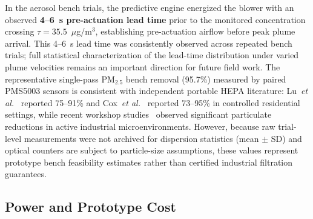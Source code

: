 \documentclass[12pt,a4paper]{article}
\newcommand{\etal}{\textit{et al.}}
\newcommand{\ugsm}{$\mu$g/m$^3$}
\begin{document}
In the aerosol bench trials, the predictive engine energized the blower with an observed
\textbf{4--6~s pre-actuation lead time} prior to the monitored concentration crossing
$\tau=35.5$~\ugsm, establishing pre-actuation airflow before peak plume arrival. This
4--6~s lead time was consistently observed across repeated bench trials; full statistical characterization
of the lead-time distribution under varied plume velocities remains an important direction for future field work.
The representative single-pass PM$_{2.5}$ bench removal (95.7\%) measured by paired PMS5003 sensors is consistent
with independent portable HEPA literature: Lu~\etal{}~\citep{lu2023realworld} reported 75--91\% and
Cox~\etal{}~\citep{cox2018effectiveness} reported 73--95\% in controlled residential settings, while recent
workshop studies~\citep{workshopcleaner2025} observed significant particulate reductions in active industrial microenvironments.
However, because raw trial-level measurements were not archived for dispersion statistics (mean $\pm$ SD) and optical
counters are subject to particle-size assumptions, these values represent prototype bench feasibility estimates rather
than certified industrial filtration guarantees.

\subsection{Power and Prototype Cost}
\end{document}
